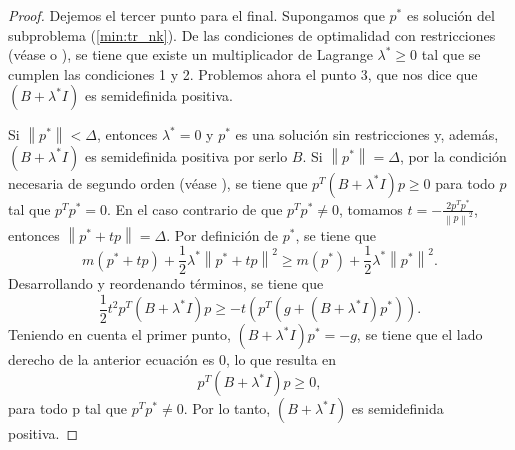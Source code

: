 \documentclass[11pt,a4paper]{book}
\theoremstyle{definition}
\theoremstyle{remark}
\newcommand{\norm}[1]{\left\lVert#1\right\rVert}
\begin{document}
\begin{proof}
Dejemos el tercer punto para el final. Supongamos que $p^*$ es solución del subproblema (\ref{min:tr_nk}). 
De las condiciones de optimalidad con restricciones (véase \cite{Nocedal2006-kh} o \cite{Sun2006-au}), se tiene
que existe un multiplicador de Lagrange $\lambda^* \geq 0$ tal que se cumplen las condiciones 1 y 2. Problemos ahora
el punto 3, que nos dice que $(B+\lambda^* I)$ es semidefinida positiva.

Si $\norm{p^*}<\Delta$, entonces $\lambda^*=0$ y $p^*$ es una solución sin restricciones y, además, $(B+\lambda^* I)$ es semidefinida positiva por serlo $B$.
Si $\norm{p^*}=\Delta$, por la condición necesaria de segundo orden (véase \cite[8.3]{Sun2006-au}), se tiene que $p^T(B+\lambda^* I)p \geq 0$ para todo $p$ tal que $p^Tp^*=0$. En el caso contrario de que $p^Tp^*\neq 0$, tomamos
$t=-\frac{2p^Tp^*}{\norm{p}^2}$, entonces $\norm{p^* +tp}=\Delta$. Por definición de $p^*$, se tiene que
\begin{equation}
m(p^*+tp)+\frac{1}{2}\lambda^* \norm{p^*+tp}^2 \geq m(p^*)+\frac{1}{2}\lambda^* \norm{p^*}^2.
\end{equation}
Desarrollando y reordenando términos, se tiene que
\begin{equation}
	\frac{1}{2}t^2p^T(B+\lambda^* I)p \geq -t(p^T(g+(B+\lambda^* I)p^*)).
\end{equation}
Teniendo en cuenta el primer punto, $(B+\lambda^* I)p^*=-g$, se tiene que el lado derecho de la anterior ecuación es $0$, lo que resulta en
\begin{equation}
	p^T(B+\lambda^* I)p \geq 0,
\end{equation}
para todo p tal que $p^Tp^*\neq 0$. Por lo tanto, $(B+\lambda^* I)$ es semidefinida positiva.


\end{proof}
\end{document}
